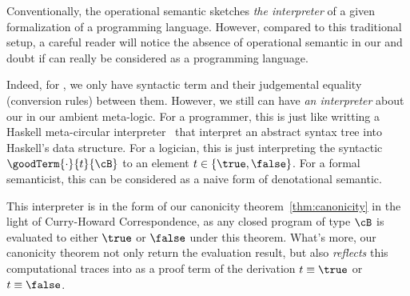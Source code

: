   Conventionally, the operational semantic sketches \emph{the interpreter} of a given formalization of a programming language. However, compared to this traditional setup, a careful reader will notice the absence of operational semantic in our \TT and doubt if \TT can really be considered as a programming language.

Indeed, for \TT, we only have syntactic term and their judgemental equality (conversion rules) between them. However, we still can have \emph{an interpreter} about our \TT in our ambient meta-logic. For a programmer, this is just like writting a Haskell meta-circular interpreter~\cite{abelson1996structure} that interpret an abstract syntax tree into Haskell's data structure. For a logician, this is just interpreting the syntactic $\goodTerm{\cdot}{t}{\cB}$ to an element $t \in \{\true, \false \}$. For a formal semanticist, this can be considered as a naive form of denotational semantic. 

This interpreter is in the form of our canonicity theorem~\cref{thm:canonicity} in the light of Curry-Howard Correspondence, as any closed program of type $\cB$ is evaluated to either $\true$ or $\false$ under this theorem.
What's more, our canonicity theorem not only return the evaluation result, but also \emph{reflects} this computational traces into \TT as a proof term of the derivation $t \equiv \true$ or $t \equiv \false$.  
